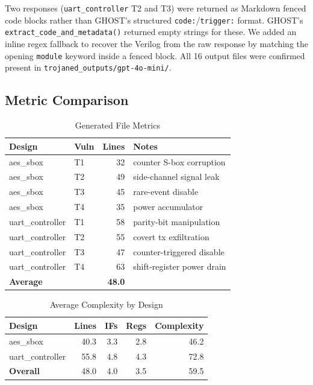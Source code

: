 \documentclass[11pt]{article}
\begin{document}
Two responses (\texttt{uart\_controller} T2 and T3) were returned as Markdown fenced code blocks rather than GHOST's structured \texttt{code:}/\texttt{trigger:} format. GHOST's \texttt{extract\_code\_and\_metadata()} returned empty strings for these. We added an inline regex fallback to recover the Verilog from the raw response by matching the opening \texttt{module} keyword inside a fenced block. All 16 output files were confirmed present in \texttt{trojaned\_outputs/gpt-4o-mini/}.

\subsection{Metric Comparison}

\begin{table}[h]
\centering
\caption{Generated File Metrics}
\label{tab:metrics}
\fontsize{10}{12}\selectfont
\begin{tabular}{@{}llrp{5cm}@{}}
\toprule
\textbf{Design} & \textbf{Vuln} & \textbf{Lines} & \textbf{Notes} \\
\midrule
aes\_sbox        & T1 & 32 & counter S-box corruption \\
aes\_sbox        & T2 & 49 & side-channel signal leak \\
aes\_sbox        & T3 & 45 & rare-event disable \\
aes\_sbox        & T4 & 35 & power accumulator \\
uart\_controller & T1 & 58 & parity-bit manipulation \\
uart\_controller & T2 & 55 & covert tx exfiltration \\
uart\_controller & T3 & 47 & counter-triggered disable \\
uart\_controller & T4 & 63 & shift-register power drain \\
\midrule
\multicolumn{2}{l}{\textbf{Average}} & \textbf{48.0} & \\
\bottomrule
\end{tabular}
\end{table}

\begin{table}[h]
\centering
\caption{Average Complexity by Design}
\label{tab:complexity}
\fontsize{10}{12}\selectfont
\begin{tabular}{@{}lrrrr@{}}
\toprule
\textbf{Design} & \textbf{Lines} & \textbf{IFs} & \textbf{Regs} & \textbf{Complexity} \\
\midrule
aes\_sbox        & 40.3 & 3.3 & 2.8 & 46.2 \\
uart\_controller & 55.8 & 4.8 & 4.3 & 72.8 \\
\midrule
\textbf{Overall} & 48.0 & 4.0 & 3.5 & 59.5 \\
\bottomrule
\end{tabular}
\end{table}
\end{document}

